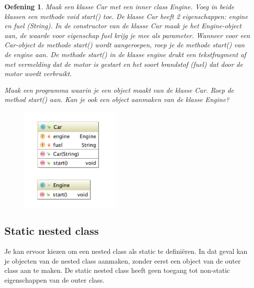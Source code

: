 \documentclass{tstextbook}
\newtheorem{envoefening}{Oefening}[chapter]
\newenvironment{oefening}
               {\begin{boxexercise}\begin{envoefening}}
               {\end{envoefening}\end{boxexercise}}
\begin{document}
\begin{oefening}
Maak een klasse \textit{Car} met een inner class \textit{Engine}.
Voeg in beide klassen een methode \textit{void start()} toe.
De klasse Car heeft 2 eigenschappen: engine en fuel (String). 
In de constructor van de klasse Car maak je het Engine-object aan, de waarde voor eigenschap fuel krijg je mee als parameter.
Wanneer voor een Car-object de methode start() wordt aangeroepen, roep je de methode start() van de engine aan. De methode start() in de klasse engine drukt een tekstfragment af met vermelding dat de motor is gestart en het soort brandstof (fuel) dat door de motor wordt verbruikt.

Maak een programma waarin je een object maakt van de klasse Car. Roep de method start() aan. Kan je ook een object aanmaken van de klasse Engine?

\begin{figure}[H]
  \includegraphics[width=5cm]{images/h5/oefening1.png}
  \label{fig:nested_classes}
\end{figure}

\end{oefening}

\subsection{Static nested class}

Je kan ervoor kiezen om een nested class als static te defini\"eren. In dat geval kan je objecten van de nested class aanmaken, zonder eerst een object van de outer class aan te maken. De static nested class heeft geen toegang tot non-static eigenschappen van de outer class.
\end{document}
